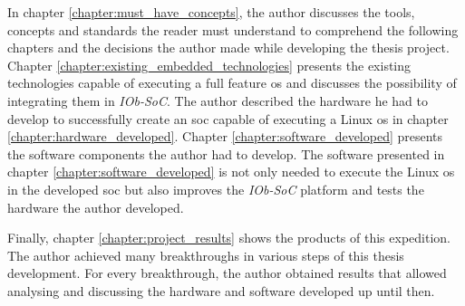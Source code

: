 In chapter \ref{chapter:must_have_concepts}, the author discusses the tools, concepts and standards the reader must understand to comprehend the following chapters and the decisions the author made while developing the thesis project. Chapter \ref{chapter:existing_embedded_technologies} presents the existing technologies capable of executing a full feature \acrlong{os} and discusses the possibility of integrating them in \textit{IOb-SoC}. The author described the hardware he had to develop to successfully create an \acrshort{soc} capable of executing a Linux \acrshort{os} in chapter \ref{chapter:hardware_developed}. Chapter \ref{chapter:software_developed} presents the software components the author had to develop. The software presented in chapter \ref{chapter:software_developed} is not only needed to execute the Linux \acrshort{os} in the developed \acrshort{soc} but also improves the \textit{IOb-SoC} platform and tests the hardware the author developed.

Finally, chapter \ref{chapter:project_results} shows the products of this expedition. The author achieved many breakthroughs in various steps of this thesis development. For every breakthrough, the author obtained results that allowed analysing and discussing the hardware and software developed up until then.

